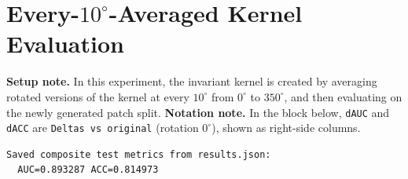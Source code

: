 \documentclass{article}
\begin{document}
\section{\texorpdfstring{Every-$10^\circ$-Averaged Kernel Evaluation}{Every-10-degree-Averaged Kernel Evaluation}}\label{app:every10_tenavg}
\textbf{Setup note.} In this experiment, the invariant kernel is created by averaging rotated versions of the kernel at every $10^\circ$ from $0^\circ$ to $350^\circ$, and then evaluating on the newly generated patch split.
\textbf{Notation note.} In the block below, \texttt{dAUC} and \texttt{dACC} are \texttt{Deltas vs original} (rotation $0^\circ$), shown as right-side columns.

\begin{verbatim}
Saved composite test metrics from results.json:
  AUC=0.893287 ACC=0.814973


\end{verbatim}
\end{document}
